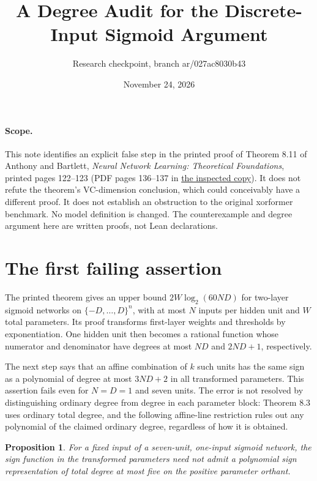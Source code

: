 \documentclass[11pt]{article}
\title{A Degree Audit for the Discrete-Input Sigmoid Argument}
\author{Research checkpoint, branch ar/027ac8030b43}
\date{November 24, 2026}
\newtheorem{proposition}{Proposition}
\begin{document}
\maketitle

\paragraph{Scope.}
This note identifies an explicit false step in the printed proof of
Theorem 8.11 of Anthony and Bartlett, \emph{Neural Network Learning:
Theoretical Foundations}, printed pages 122--123 (PDF pages 136--137 in
\href{https://openeclass.panteion.gr/modules/document/file.php/PMS152/LEARNING/Anthony\%20Martin\%2C\%20Bartlett\%20Peter\%20L.\%20\%282009\%29\%20--\%20Neural\%20Network\%20Learning_\%20Theoretical\%20Foundations.pdf}{the inspected copy}).
It does not refute the theorem's VC-dimension conclusion, which could
conceivably have a different proof. It does not establish an obstruction
to the original xorformer benchmark. No model definition is changed.
The counterexample and degree argument here are written proofs, not
Lean declarations.

\section{The first failing assertion}

The printed theorem gives an upper bound $2W\log_2(60ND)$ for two-layer
sigmoid networks on $\{-D,\ldots,D\}^n$, with at most $N$ inputs per
hidden unit and $W$ total parameters. Its proof transforms first-layer
weights and thresholds by exponentiation. One hidden unit then becomes
a rational function whose numerator and denominator have degrees at most
$ND$ and $2ND+1$, respectively.

The next step says that an affine combination of $k$ such units has the
same sign as a polynomial of degree at most $3ND+2$ in all transformed
parameters. This assertion fails even for $N=D=1$ and seven units.
The error is not resolved by distinguishing ordinary degree from degree
in each parameter block: Theorem 8.3 uses ordinary total degree, and the
following affine-line restriction rules out any polynomial of the claimed
ordinary degree, regardless of how it is obtained.

\begin{proposition}
For a fixed input of a seven-unit, one-input sigmoid network, the sign
function in the transformed parameters need not admit a polynomial sign
representation of total degree at most five on the positive parameter
orthant.
\end{proposition}
\end{document}
